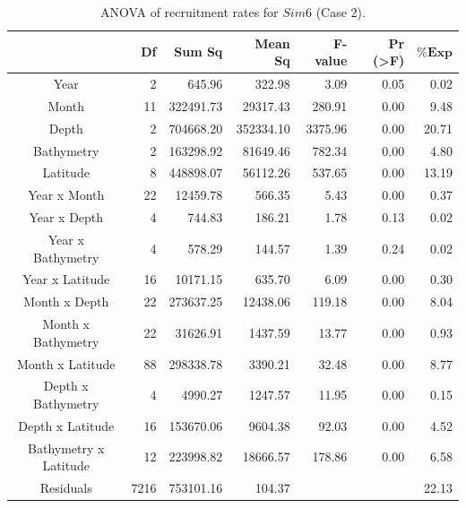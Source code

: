 \begin{table}[H]
\centering
\caption{ANOVA of recruitment rates for $Sim 6$ (Case 2).}
\begin{adjustbox}{width=0.9\textwidth}
\small
\begin{tabular}{c|r|r|r|r|r|r}
\toprule
                                  &
	\textbf{Df}                   &
	\textbf{Sum Sq}               &
	\textbf{Mean Sq}              &
	\textbf{F-value}    		   &
	\textbf{Pr (\textgreater{F})} &
	$\mathbf{\% Exp}$      \\
\midrule
Year                  & 2    & 645.96    & 322.98    & 3.09    & 0.05                & 0.02  \\
Month                 & 11   & 322491.73 & 29317.43  & 280.91  & 0.00                & 9.48  \\
Depth                 & 2    & 704668.20 & 352334.10 & 3375.96 & 0.00                & 20.71 \\
Bathymetry            & 2    & 163298.92 & 81649.46  & 782.34  & 0.00                & 4.80  \\
Latitude              & 8    & 448898.07 & 56112.26  & 537.65  & 0.00                & 13.19 \\
Year x Month          & 22   & 12459.78  & 566.35    & 5.43    & 0.00                & 0.37  \\
Year x Depth          & 4    & 744.83    & 186.21    & 1.78    & 0.13                & 0.02  \\
Year x Bathymetry     & 4    & 578.29    & 144.57    & 1.39    & 0.24                & 0.02  \\
Year x Latitude       & 16   & 10171.15  & 635.70    & 6.09    & 0.00                & 0.30  \\
Month x Depth         & 22   & 273637.25 & 12438.06  & 119.18  & 0.00                & 8.04  \\
Month x Bathymetry    & 22   & 31626.91  & 1437.59   & 13.77   & 0.00                & 0.93  \\
Month x Latitude      & 88   & 298338.78 & 3390.21   & 32.48   & 0.00                & 8.77  \\
Depth x Bathymetry    & 4    & 4990.27   & 1247.57   & 11.95   & 0.00                & 0.15  \\
Depth x Latitude      & 16   & 153670.06 & 9604.38   & 92.03   & 0.00                & 4.52  \\
Bathymetry x Latitude & 12   & 223998.82 & 18666.57  & 178.86  & 0.00                & 6.58  \\
Residuals             & 7216 & 753101.16 & 104.37    &         &                     & 22.13 \\
\bottomrule
\end{tabular}
\end{adjustbox}
\label{Chap3ANOVAsim6}
\end{table}

